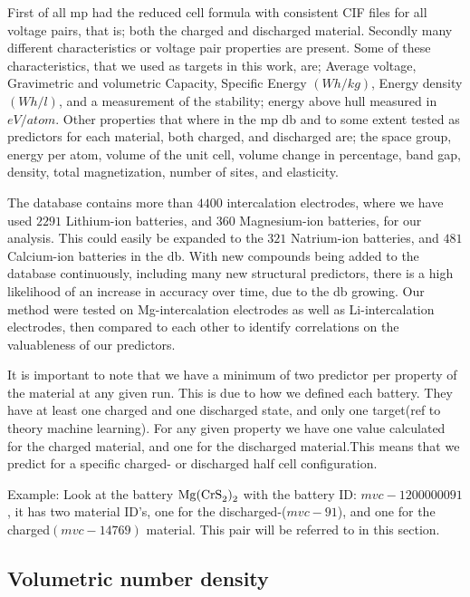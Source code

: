 	 First of all mp had the reduced cell formula with consistent CIF files for all voltage pairs, that is; both the charged and discharged material. Secondly many different characteristics or voltage pair properties are present. Some of these characteristics, that we used as targets in this work, are; Average voltage, Gravimetric and volumetric Capacity, Specific Energy $(Wh/kg)$, Energy density $(Wh/ l )$, and a measurement of the stability; energy above hull measured in  $\si{eV/atom}$. Other properties that where in the mp db and to some extent tested as predictors for each material, both charged, and discharged are; the space group, energy per atom, volume of the unit cell, volume change in percentage, band gap, density, total magnetization, number of sites, and elasticity. 

The database contains more than $4400$ intercalation electrodes, where we have used $2291$ Lithium-ion batteries, and $360$ Magnesium-ion batteries, for our analysis. This could easily be expanded to the $321$ Natrium-ion batteries, and $481$ Calcium-ion batteries in the db. With new compounds being added to the database continuously, including many new structural predictors, there is a high likelihood of an increase in accuracy over time, due to the db growing. Our method were tested on Mg-intercalation electrodes as well as Li-intercalation electrodes, then compared to each other to identify correlations on the valuableness of our predictors. 

	It is important to note that we have a minimum of two predictor per property of the material at any given run. This is due to how we defined each battery. They have at least one charged and one discharged state, and only one target(ref to theory machine learning). For any given property we have one value calculated for the charged material, and one for the discharged material.This means that we predict for a specific charged- or discharged half cell configuration.

Example:
Look at the battery $\ce{Mg(CrS_2)_2}$ with the battery ID: $mvc-1200000091$, it has two material ID's, one for the discharged-($mvc-91$)\label{ex:MgCrS22-discharged}, and one for the charged$(mvc-14769)\label{ex:MgCrS22-charged}$ material. This pair will be referred to in this section. 


\subsection{Volumetric number density }

